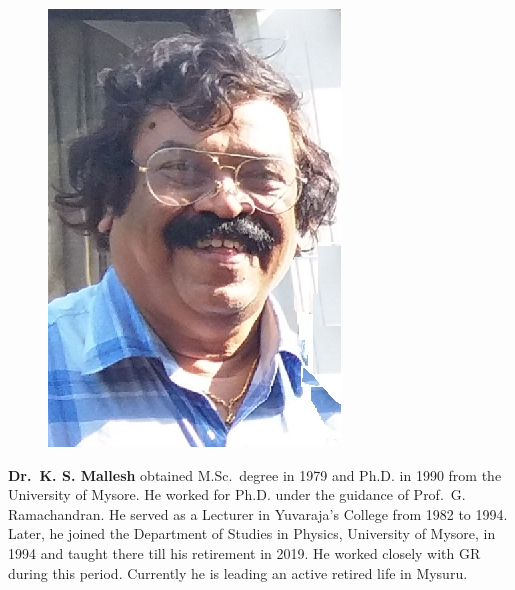 \begin{figure}%
\vspace{-4\baselineskip}
\includegraphics[scale=0.8]{authorsphotos/Prof_K_S_Mallesh.eps}
\end{figure}%
\noindent
\textbf{Dr.\ K. S. Mallesh} obtained M.Sc.\ degree in 1979 and Ph.D. in 1990 from the University of Mysore. He worked for Ph.D. under the guidance of Prof.\ G. Ramachandran.  He served as a Lecturer in Yuvaraja’s College from 1982 to 1994. Later, he joined the Department of Studies in Physics, University of Mysore, in 1994 and taught there till his retirement in 2019.  He worked closely with GR during this period.  Currently he is leading an active retired life in Mysuru.


